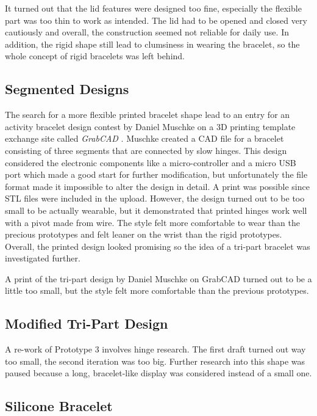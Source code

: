 It turned out that the lid features were designed too fine, especially the flexible part was too thin to work as intended. The lid had to be opened and closed very cautiously and overall, the construction seemed not reliable for daily use. In addition, the rigid shape still lead to clumsiness in wearing the bracelet, so the whole concept of rigid bracelets was left behind.

\subsection{Segmented Designs}

The search for a more flexible printed bracelet shape lead to an entry for an activity bracelet design contest by Daniel Muschke on a 3D printing template exchange site called \textit{GrabCAD} \cite{amicobracelet}. Muschke created a \ac{CAD} file for a bracelet consisting of three segments that are connected by slow hinges. This design considered the electronic components like a micro-controller and a micro \ac{USB} port which made a good start for further modification, but unfortunately the file format made it impossible to alter the design in detail. A print was possible since \ac{STL} files were included in the upload. However, the design turned out to be too small to be actually wearable, but it demonstrated that printed hinges work well with a pivot made from wire. The style felt more comfortable to wear than the precious prototypes and felt leaner on the wrist than the rigid prototypes. Overall, the printed design looked promising so the idea of a tri-part bracelet was investigated further.

A print of the tri-part design by Daniel Muschke on GrabCAD turned out to be a little too small, but the style felt more comfortable than the previous prototypes.

\subsection{Modified Tri-Part Design}

A re-work of Prototype 3 involves hinge research. The first draft turned out way too small, the second iteration was too big. Further research into this shape was paused because a long, bracelet-like display was considered instead of a small one.

\subsection{Silicone Bracelet}

